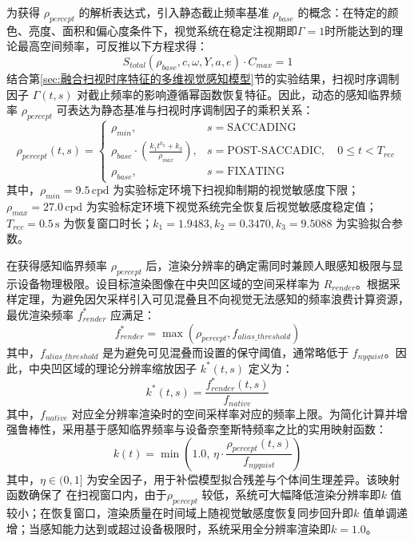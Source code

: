 为获得 $\rho_{percept}$ 的解析表达式，引入静态截止频率基准 $\rho_{base}$ 的概念：在特定的颜色、亮度、面积和偏心度条件下，视觉系统在稳定注视期即$\Gamma=1$时所能达到的理论最高空间频率，可反推以下方程求得：
\begin{equation}
S_{total}(\rho_{base}, c, \omega, Y, a, e) \cdot C_{max} = 1
\end{equation}
结合第\ref{sec:融合扫视时序特征的多维视觉感知模型}节的实验结果，扫视时序调制因子 $\Gamma(t, s)$ 对截止频率的影响遵循幂函数恢复特征。因此，动态的感知临界频率 $\rho_{percept}$ 可表达为静态基准与扫视时序调制因子的乘积关系：
\begin{equation}
\rho_{percept}(t, s) = 
\begin{cases} 
\rho_{min}, & s = \text{SACCADING} \\
\rho_{base} \cdot \left( \frac{k_1 t^{k_2} + k_3}{\rho_{max}} \right), & s = \text{POST-SACCADIC}, \quad 0 \leq t < T_{rec} \\
\rho_{base}, & s = \text{FIXATING}
\end{cases}
\label{eq:perceptual_critical_freq}
\end{equation}
其中，\(\rho_{min} = 9.5 \, \text{cpd}\) 为实验标定环境下扫视抑制期的视觉敏感度下限；\(\rho_{max} = 27.0 \, \text{cpd}\) 为实验标定环境下视觉系统完全恢复后视觉敏感度稳定值；\(T_{rec} = 0.5 \, \text{s}\) 为恢复窗口时长；\(k_1 = 1.9483, k_2 = 0.3470, k_3 = 9.5088\) 为实验拟合参数。


在获得感知临界频率 $\rho_{percept}$ 后，渲染分辨率的确定需同时兼顾人眼感知极限与显示设备物理极限。设目标渲染图像在中央凹区域的空间采样率为 \(R_{render}\)。根据采样定理，为避免因欠采样引入可见混叠且不向视觉无法感知的频率浪费计算资源，最优渲染频率 \(f_{render}^{*}\) 应满足：
\begin{equation}
f_{render}^{*} = \max\left( \rho_{percept}, f_{alias\_threshold} \right)
\label{eq:optimal_render_freq}
\end{equation}
其中，\(f_{alias\_threshold}\) 是为避免可见混叠而设置的保守阈值，通常略低于 \(f_{nyquist}\)。因此，中央凹区域的理论分辨率缩放因子 \(k^{*}(t, s)\) 定义为：
\begin{equation}
k^{*}(t, s) = \frac{f_{render}^{*}(t, s)}{f_{native}}
\label{eq:theoretical_scale_factor}
\end{equation}
其中，\(f_{native}\) 对应全分辨率渲染时的空间采样率对应的频率上限。为简化计算并增强鲁棒性，采用基于感知临界频率与设备奈奎斯特频率之比的实用映射函数：
\begin{equation}
k(t) = \min \left( 1.0, \, \eta \cdot \frac{\rho_{percept}(t, s)}{f_{nyquist}} \right)
\label{eq:practical_scale_factor}
\end{equation}
其中，\(\eta \in (0, 1]\) 为安全因子，用于补偿模型拟合残差与个体间生理差异。该映射函数确保了
在扫视窗口内，由于\(\rho_{percept}\) 较低，系统可大幅降低渲染分辨率即\(k\) 值较小；在恢复窗口，渲染质量在时间域上随视觉敏感度恢复同步回升即\(k\) 值单调递增；当感知能力达到或超过设备极限时，系统采用全分辨率渲染即\(k=1.0\)。

